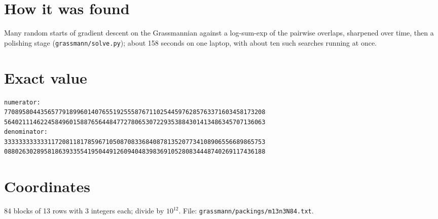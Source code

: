 \documentclass[11pt,a4paper]{article}
\begin{document}
\section{How it was found}
Many random starts of gradient descent on the Grassmannian against a log-sum-exp of the pairwise overlaps, sharpened over time, then a polishing stage (\texttt{grassmann/solve.py}); about 158 seconds on one laptop, with about ten such searches running at once.


\appendix
\section{Exact value}
{\small
\begin{verbatim}
numerator:
770895804435657791899601407655192555876711025445976285763371603458173208
564021114622458496015887656448477278065307229353884301413486345707136063
denominator:
333333333333117208118178596710508708336840878135207734108906556689865753
088026302895818639335541950449126094048398369105280834448740269117436188
\end{verbatim}}

\section{Coordinates}
84 blocks of 13 rows with 3 integers each; divide by $10^{12}$. File: \texttt{grassmann/packings/m13n3N84.txt}.
{\tiny
\begin{multicols}{3}
\end{multicols}}
\end{document}

